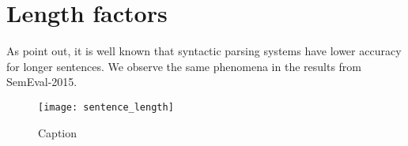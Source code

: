 \section{Length factors}

As  point out, it is well known that syntactic parsing systems have lower accuracy for longer sentences. We observe the same phenomena in the results from SemEval-2015.

\begin{figure}[h]
\caption{Caption}
\centering
\texttt{[image: sentence\_length]}
\label{fig:sentence_length}
\end{figure}


